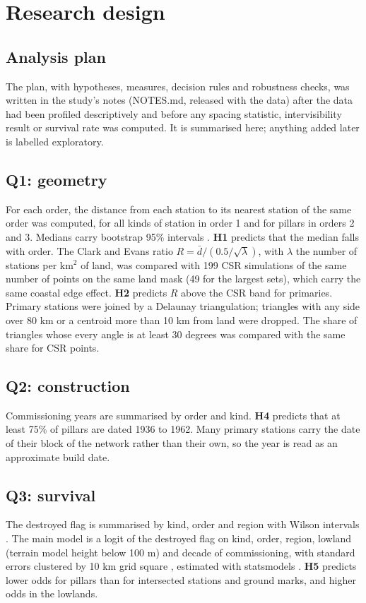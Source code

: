 \documentclass[11pt,a4paper]{article}
\begin{document}
\section{Research design}\label{sec:design}
\subsection{Analysis plan}
The plan, with hypotheses, measures, decision rules and robustness checks, was written in the study's notes (NOTES.md, released with the data) after the data had been profiled descriptively and before any spacing statistic, intervisibility result or survival rate was computed. It is summarised here; anything added later is labelled exploratory.

\subsection{Q1: geometry}
For each order, the distance from each station to its nearest station of the same order was computed, for all kinds of station in order 1 and for pillars in orders 2 and 3. Medians carry bootstrap 95\% intervals \citep{efron1979}. \textbf{H1} predicts that the median falls with order. The Clark and Evans ratio $R = \bar d / (0.5/\sqrt{\lambda})$, with $\lambda$ the number of stations per km$^2$ of land, was compared with 199 CSR simulations of the same number of points on the same land mask (49 for the largest sets), which carry the same coastal edge effect. \textbf{H2} predicts $R$ above the CSR band for primaries. Primary stations were joined by a Delaunay triangulation; triangles with any side over 80 km or a centroid more than 10 km from land were dropped. The share of triangles whose every angle is at least 30 degrees was compared with the same share for CSR points.

\subsection{Q2: construction}
Commissioning years are summarised by order and kind. \textbf{H4} predicts that at least 75\% of pillars are dated 1936 to 1962. Many primary stations carry the date of their block of the network rather than their own, so the year is read as an approximate build date.

\subsection{Q3: survival}
The destroyed flag is summarised by kind, order and region with Wilson intervals \citep{wilson1927}. The main model is a logit of the destroyed flag on kind, order, region, lowland (terrain model height below 100 m) and decade of commissioning, with standard errors clustered by 10 km grid square \citep{cameron2015}, estimated with statsmodels \citep{seabold2010}. \textbf{H5} predicts lower odds for pillars than for intersected stations and ground marks, and higher odds in the lowlands.
\end{document}
